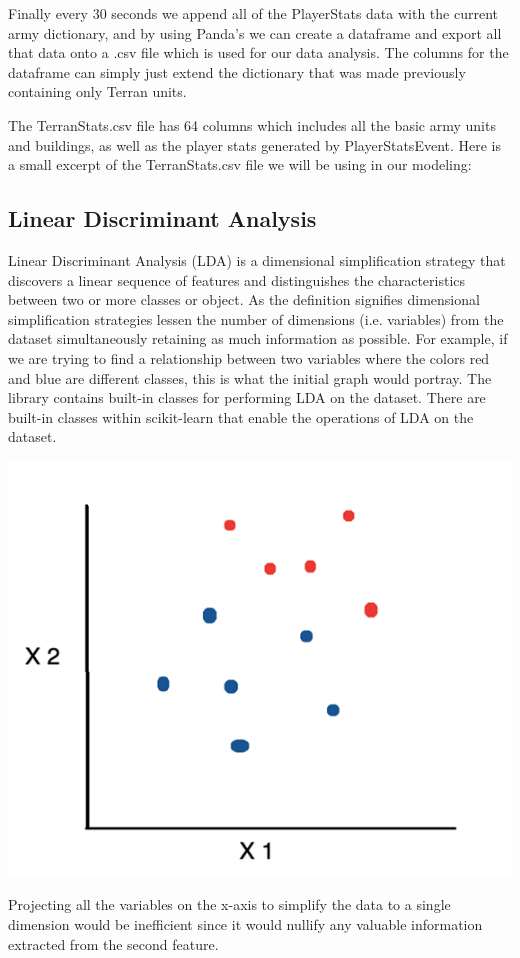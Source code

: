 \documentclass[a4paper,12pt]{report}
\begin{document}
Finally every 30 seconds we append all of the PlayerStats data with the current army dictionary, and by using Panda’s we can create a dataframe and export all that data onto a .csv file which is used for our data analysis. The columns for the dataframe can simply just extend the dictionary that was made previously containing only Terran units.


The TerranStats.csv file has 64 columns which includes all the basic army units and buildings, as well as the player stats generated by PlayerStatsEvent. Here is a small excerpt of the TerranStats.csv file we will be using in our modeling:

\subsection{Linear Discriminant Analysis}
 
Linear Discriminant Analysis (LDA) is a dimensional simplification strategy that discovers a linear sequence of features and distinguishes the characteristics between two or more classes or object. As the definition signifies dimensional simplification strategies lessen the number of dimensions (i.e. variables) from the dataset simultaneously retaining as much information as possible. For example, if we are trying to find a relationship between two variables where the colors red and blue are different classes, this is what the initial graph would portray. The library contains built-in classes for performing LDA on the dataset. There are built-in classes within scikit-learn that enable the operations of LDA on the dataset.

\begin{center}
    \captionsetup{type=figure}
    \includegraphics[width=.5\linewidth]{media/LDAGraph.png}
\end{center}

Projecting all the variables on the x-axis to simplify the data to a single dimension would be inefficient since it would nullify any valuable information extracted from the second feature.
\end{document}
